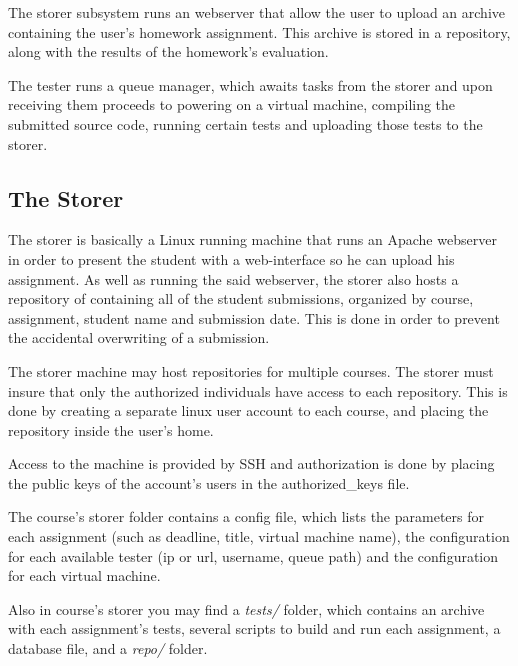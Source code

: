\begin{center}
\end{center}

The storer subsystem runs an webserver that allow the user to upload an archive
containing the user's homework assignment. This archive is stored in a repository,
along with the results of the homework's evaluation.

The tester runs a queue manager, which awaits tasks from the storer and upon
receiving them proceeds to powering on a virtual machine, compiling the submitted
source code, running certain tests and uploading those tests to the storer.


\subsection{The Storer}
\label{sub-sec:storer}

The storer is basically a Linux running machine that runs an Apache webserver
in order to present the student with a web-interface so he can upload his
assignment. As well as running the said webserver, the storer also hosts a 
repository of containing all of the student submissions, organized by course,
assignment, student name and submission date. This is done in order to prevent
the accidental overwriting of a submission.

\begin{center}
\end{center}

The storer machine may host repositories for multiple courses. The storer
must insure that only the authorized individuals have access to each repository.
This is done by creating a separate linux user account to each course, and placing
the repository inside the user's home. 

Access to the machine is provided by SSH and authorization is done by placing
the public keys of the account's users in the authorized_keys file.

The course's storer folder contains a config file, which lists the parameters
for each assignment (such as deadline, title, virtual machine name), the 
configuration for each available tester (ip or url, username, queue path)
and the configuration for each virtual machine.

Also in course's storer you may find a \textit{tests/} folder, which contains an archive
with each assignment's tests, several scripts to build and run each assignment,
a database file, and a \textit{repo/} folder.

